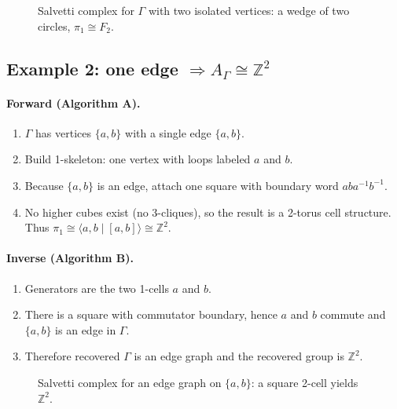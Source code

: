 \documentclass[11pt]{article}
\theoremstyle{definition}
\theoremstyle{plain}
\theoremstyle{remark}
\begin{document}
\begin{figure}[h]
\centering
{}
\caption{Salvetti complex for $\Gamma$ with two isolated vertices: a wedge of two circles, $\pi_1\cong F_2$.}
\end{figure}

\subsection*{Example 2: one edge $\Rightarrow A_\Gamma\cong \mathbb Z^2$}
\paragraph{Forward (Algorithm A).}
\begin{enumerate}[leftmargin=2.2em]
\item $\Gamma$ has vertices $\{a,b\}$ with a single edge $\{a,b\}$.
\item Build 1-skeleton: one vertex with loops labeled $a$ and $b$.
\item Because $\{a,b\}$ is an edge, attach one square with boundary word $aba^{-1}b^{-1}$.
\item No higher cubes exist (no 3-cliques), so the result is a 2-torus cell structure.
Thus $\pi_1\cong \langle a,b\mid [a,b]\rangle\cong \mathbb Z^2$.
\end{enumerate}

\paragraph{Inverse (Algorithm B).}
\begin{enumerate}[leftmargin=2.2em]
\item Generators are the two 1-cells $a$ and $b$.
\item There is a square with commutator boundary, hence $a$ and $b$ commute and $\{a,b\}$ is an edge in $\Gamma$.
\item Therefore recovered $\Gamma$ is an edge graph and the recovered group is $\mathbb Z^2$.
\end{enumerate}

\begin{figure}[h]
\centering
{}
\caption{Salvetti complex for an edge graph on $\{a,b\}$: a square 2-cell yields $\mathbb Z^2$.}
\end{figure}
\end{document}
